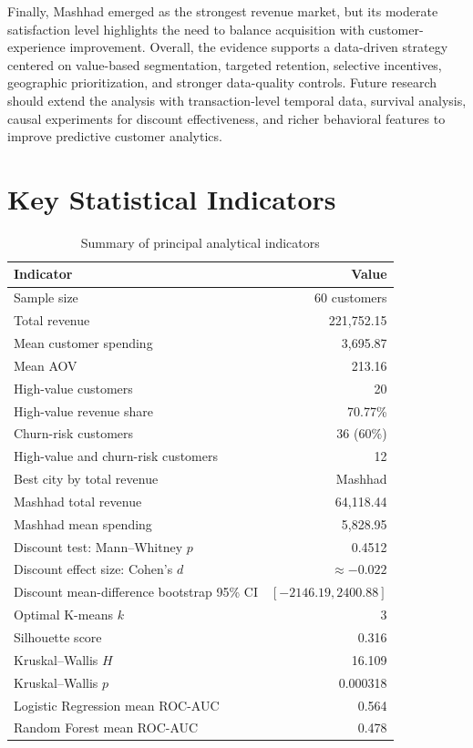 \documentclass[11pt,a4paper]{article}
\begin{document}
Finally, Mashhad emerged as the strongest revenue market, but its
moderate satisfaction level highlights the need to balance acquisition
with customer-experience improvement. Overall, the evidence supports a
data-driven strategy centered on value-based segmentation, targeted
retention, selective incentives, geographic prioritization, and stronger
data-quality controls. Future research should extend the analysis with
transaction-level temporal data, survival analysis, causal experiments
for discount effectiveness, and richer behavioral features to improve
predictive customer analytics.

\section*{Key Statistical Indicators}

\begin{table}[H]
\centering
\caption{Summary of principal analytical indicators}
\begin{tabular}{lr}
\toprule
Indicator & Value \\
\midrule
Sample size & 60 customers \\
Total revenue & 221,752.15 \\
Mean customer spending & 3,695.87 \\
Mean AOV & 213.16 \\
High-value customers & 20 \\
High-value revenue share & 70.77\% \\
Churn-risk customers & 36 (60\%) \\
High-value and churn-risk customers & 12 \\
Best city by total revenue & Mashhad \\
Mashhad total revenue & 64,118.44 \\
Mashhad mean spending & 5,828.95 \\
Discount test: Mann--Whitney $p$ & 0.4512 \\
Discount effect size: Cohen's $d$ & $\approx -0.022$ \\
Discount mean-difference bootstrap 95\% CI & $[-2146.19,2400.88]$ \\
Optimal K-means $k$ & 3 \\
Silhouette score & 0.316 \\
Kruskal--Wallis $H$ & 16.109 \\
Kruskal--Wallis $p$ & 0.000318 \\
Logistic Regression mean ROC-AUC & 0.564 \\
Random Forest mean ROC-AUC & 0.478 \\
\bottomrule
\end{tabular}
\end{table}
\end{document}
